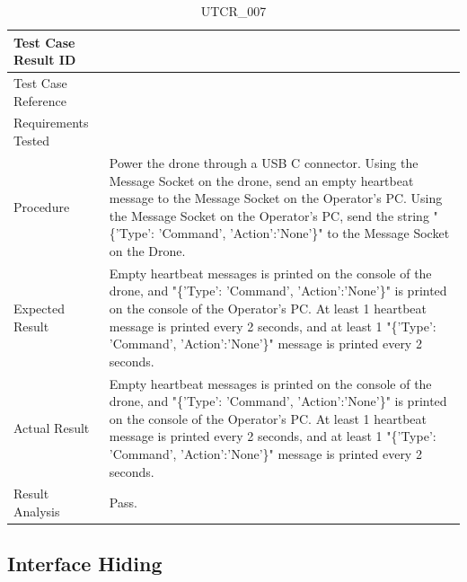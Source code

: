 \documentclass[12pt, titlepage]{article}
\begin{document}
\begin{table}[!h]
\begin{center}
\caption {UTCR\_007}
\label{tab:UTCR_007}
\begin{tabular}{ | m{3.2cm} | m{12.2cm} | } 
\hline
Test Case Result ID & \nameref{tab:UTCR_007} \\ 
\hline
Test Case Reference & \nameref{tab:UTC_007}  \\ 
\hline
Requirements Tested & \nameref{PERF_004} \\ 
\hline
Procedure & Power the drone through a USB C connector. Using the Message Socket on the drone, send an empty heartbeat message to the Message Socket on the Operator's PC. Using the Message Socket on the Operator's PC, send the string "\{'Type': 'Command', 'Action':'None'\}" to the Message Socket on the Drone. \\ 
\hline
Expected Result & Empty heartbeat messages is printed on the console of the drone, and  "\{'Type': 'Command', 'Action':'None'\}" is printed on the console of the Operator's PC. At least 1 heartbeat message is printed every 2 seconds, and at least 1 "\{'Type': 'Command', 'Action':'None'\}" message is printed every 2 seconds. \\ 
\hline
Actual Result & Empty heartbeat messages is printed on the console of the drone, and  "\{'Type': 'Command', 'Action':'None'\}" is printed on the console of the Operator's PC. At least 1 heartbeat message is printed every 2 seconds, and at least 1 "\{'Type': 'Command', 'Action':'None'\}" message is printed every 2 seconds. \\ 
\hline
Result Analysis & Pass. \\ 
\hline
\end{tabular}
\end{center}
\end{table}

\clearpage

\subsection{Interface Hiding}
\label{subsec:interfaceHiding}
\end{document}
